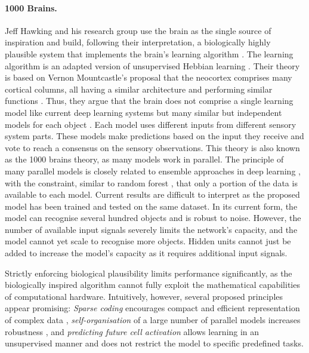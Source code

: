 \paragraph{1000 Brains.} Jeff Hawking and his research group use the brain as the single source of inspiration and build, following their interpretation, a biologically highly plausible system that implements the brain's learning algorithm \cite{hawkins_framework_2019}. The learning algorithm is an adapted version of unsupervised Hebbian learning \cite{hebb_organization_1949}. Their theory is based on Vernon Mountcastle's proposal that the neocortex comprises many cortical columns, all having a similar architecture and performing similar functions \cite{mountcastle_organizing_1978, mountcastle_columnar_1997}. Thus, they argue that the brain does not comprise a single learning model like current deep learning systems but many similar but independent models for each object . Each model uses different inputs from different sensory system parts. These models make predictions based on the input they receive and vote to reach a consensus on the sensory observations.
This theory is also known as the 1000 brains theory, as many models work in parallel. The principle of many parallel models is closely related to ensemble approaches in deep learning , with the constraint, similar to random forest , that only a portion of the data is available to each model. Current results are difficult to interpret as the proposed model has been trained and tested on the same dataset. In its current form, the model can recognise several hundred objects and is robust to noise. However, the number of available input signals severely limits the network's capacity, and the model cannot yet scale to recognise more objects.
Hidden units cannot just be added to increase the model's capacity as it requires additional input signals.

Strictly enforcing biological plausibility limits performance significantly, as the biologically inspired algorithm cannot fully exploit the mathematical capabilities of computational hardware. Intuitively, however, several proposed principles appear promising: \emph{Sparse coding} encourages compact and efficient representation of complex data , \emph{self-organisation} of a large number of parallel models increases robustness \cite{yang_survey_2023}, and \emph{predicting future cell activation} allows learning in an unsupervised manner and does not restrict the model to specific predefined tasks.

